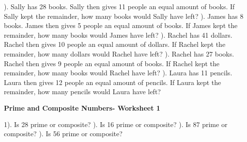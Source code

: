 \documentclass{article}%
\begin{document}
\newline%
). Sally has 28 books. Sally then gives 11 people an equal amount of books. If Sally kept the remainder, how many books would Sally have left?%
\newline%
\newline%
). James has 8 books. James then gives 5 people an equal amount of books. If James kept the remainder, how many books would James have left?%
\newline%
\newline%
). Rachel has 41 dollars. Rachel then gives 10 people an equal amount of dollars. If Rachel kept the remainder, how many dollars would Rachel have left?%
\newline%
\newline%
). Rachel has 27 books. Rachel then gives 9 people an equal amount of books. If Rachel kept the remainder, how many books would Rachel have left?%
\newline%
\newline%
). Laura has 11 pencils. Laura then gives 12 people an equal amount of pencils. If Laura kept the remainder, how many pencils would Laura have left?%
\newline%
\newline%
\newline%
\pagebreak%
\large%
\begin{center}%
\textbf{Prime and Composite Numbers- Worksheet 1}%
\newline%
\newline%
\newline%
\end{center} \normalsize%
1). Is 28 prime or composite?%
\newline%
\newline%
). Is 16 prime or composite?%
\newline%
\newline%
). Is 87 prime or composite?%
\newline%
\newline%
). Is 56 prime or composite?%
\newline%
\newline%
\end{document}
